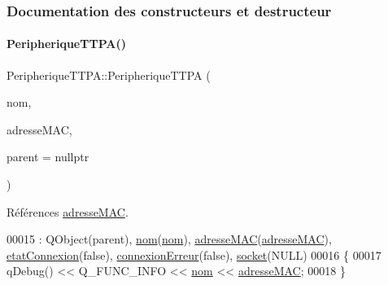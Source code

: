 \subsubsection{Documentation des constructeurs et destructeur}
\mbox{\label{class_peripherique_t_t_p_a_acb4f39a3af94d61dcb673df11bed3a15}} 
\paragraph{\texorpdfstring{Peripherique\+T\+T\+P\+A()}{PeripheriqueTTPA()}}
{\footnotesize\ttfamily Peripherique\+T\+T\+P\+A\+::\+Peripherique\+T\+T\+PA (\begin{DoxyParamCaption}\item[{Q\+String}]{nom,  }\item[{Q\+String}]{adresse\+M\+AC,  }\item[{Q\+Object $\ast$}]{parent = {\ttfamily nullptr} }\end{DoxyParamCaption})}



Références \hyperlink{class_peripherique_t_t_p_a_a444063230c83cf81eff8a3a55736f2cf}{adresse\+M\+AC}.


\begin{DoxyCode}
00015                                                                                    : QObject(parent), 
      \hyperlink{class_peripherique_t_t_p_a_afafe3566b4b5357819811218b9a4244f}{nom}(\hyperlink{class_peripherique_t_t_p_a_afafe3566b4b5357819811218b9a4244f}{nom}), \hyperlink{class_peripherique_t_t_p_a_a444063230c83cf81eff8a3a55736f2cf}{adresseMAC}(\hyperlink{class_peripherique_t_t_p_a_a444063230c83cf81eff8a3a55736f2cf}{adresseMAC}), \hyperlink{class_peripherique_t_t_p_a_a3aaac9f045cc038777895afe18411e58}{etatConnexion}(\textcolor{keyword}{false}), 
      \hyperlink{class_peripherique_t_t_p_a_a9602c4662641984ea44bf6caaac6e94c}{connexionErreur}(\textcolor{keyword}{false}), \hyperlink{class_peripherique_t_t_p_a_ab66f30984a7f9fa17fd28391efe968a9}{socket}(NULL)
00016 \{
00017     qDebug() << Q\_FUNC\_INFO << \hyperlink{class_peripherique_t_t_p_a_afafe3566b4b5357819811218b9a4244f}{nom} << \hyperlink{class_peripherique_t_t_p_a_a444063230c83cf81eff8a3a55736f2cf}{adresseMAC};
00018 \}
\end{DoxyCode}


